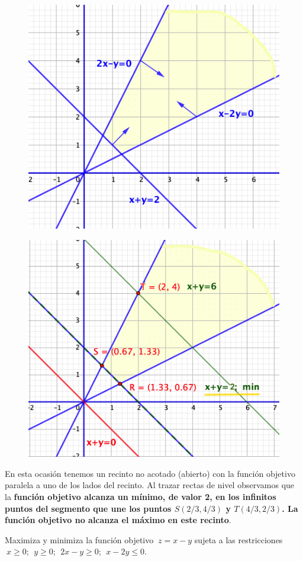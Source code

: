 \begin{multicols}{2}
\begin{figure}[H]
	\centering
	\includegraphics[width=.45\textwidth]{imagenes/img19.png}
\end{figure}
\begin{figure}[H]
	\centering
	\includegraphics[width=.45\textwidth]{imagenes/img20.png}
\end{figure}	
\end{multicols}
\vspace{5mm}


\begin{destacado}
En esta ocasión tenemos un recinto no acotado (abierto) con la función objetivo paralela a uno de los lados del recinto. Al trazar rectas de nivel observamos que la \textbf{función objetivo alcanza un mínimo, de valor 2,  en los infinitos puntos del segmento que une los puntos $S(2/3,4/3)$ y $T(4/3,2/3)$. La función objetivo no alcanza el máximo en este recinto}.
\end{destacado}


\begin{ejemplo}
\begin{ejre}
Maximiza y minimiza la función objetivo $\ z=x-y$ sujeta a las restricciones 	$\ x\ge 0;\ \ y\ge 0;\ \ 2x-y\ge 0;\ \ x-2y\le 0$.
\end{ejre}
\end{ejemplo}

